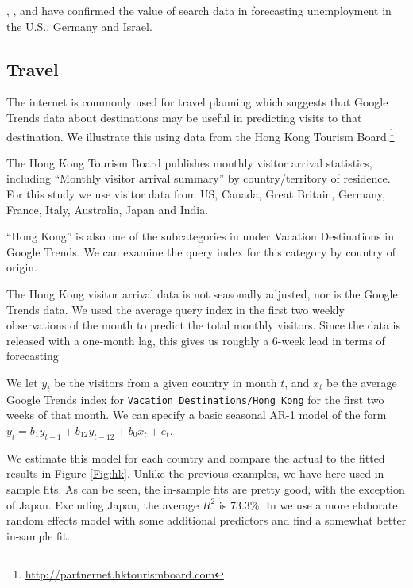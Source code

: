 \documentclass[12pt, oneside]{article}
\begin{document}
\cite{Askitas10}, \cite{Suhoy09}, and \cite{Damuri10} have confirmed
the value of search data in forecasting unemployment in the U.S.,
Germany and Israel.

\subsection{Travel} 
The internet is commonly used for travel planning which suggests that
Google Trends data about destinations may be useful in predicting
visits to that destination.  We illustrate this using data from the
Hong Kong Tourism Board.\footnote{\url{http://partnernet.hktourismboard.com}}

The Hong Kong Tourism Board publishes monthly visitor arrival
statistics, including ``Monthly visitor arrival summary'' by
country/territory of residence. For this study we use visitor data
from US, Canada, Great Britain, Germany, France, Italy, Australia,
Japan and India.

``Hong Kong'' is also one of the subcategories in under Vacation
Destinations in Google Trends.  We can examine the query index for
this category by country of origin.

The Hong Kong visitor arrival data is not seasonally adjusted, nor is
the Google Trends data.  We used the average query index in the first
two weekly observations of the month to predict the total monthly
visitors.  Since the data is released with a one-month lag, this gives
us roughly a 6-week lead in terms of forecasting

We let $y_t$ be the visitors from a given country in month $t$, and
$x_t$ be the average Google Trends index for {\tt Vacation
  Destinations/Hong Kong} for the first two weeks of that month. We
can specify a basic seasonal AR-1 model of the form $y_t = b_1y_{t-1}
+ b_{12}y_{t-12} + b_0x_{t} + e_t$.

We estimate this model for each country and compare the actual to the
fitted results in Figure \ref{Fig:hk}.  Unlike the previous examples,
we have here used in-sample fits. As can be seen, the in-sample
fits are pretty good, with the exception of Japan.  Excluding Japan,
the average $R^2$ is 73.3\%.  In \cite{Choi09a} we use a more
elaborate random effects model with some additional predictors and
find a somewhat better in-sample fit.
\end{document}

